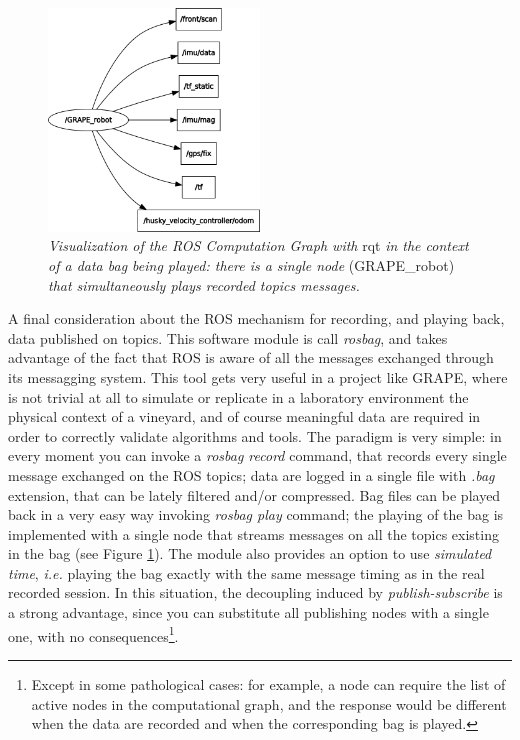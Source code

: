 \begin{figure}
	\centering
	\includegraphics[width=0.5\textwidth]{Images/background_and_tools/bagPlay.png}
	\caption{\textit{Visualization of the \ac{ROS} Computation Graph with} rqt\textit{ in the context of a data bag being played: there is a single node} (GRAPE\_robot) \textit{that simultaneously plays recorded topics messages.}}
	\label{fig:playBag}
\end{figure}

A final consideration about the \ac{ROS} mechanism for recording, and playing back, data published on topics. This software module is call \textit{rosbag}, and takes advantage of the fact that \ac{ROS} is aware of all the messages exchanged through its messagging system. This tool gets very useful in a project like \ac{GRAPE}, where is not trivial at all to simulate or replicate in a laboratory environment the physical context of a vineyard, and of course meaningful data are required in order to correctly validate algorithms and tools.
The paradigm is very simple: in every moment you can invoke a \textit{rosbag record} command, that records every single message exchanged on the \ac{ROS} topics; data are logged in a single file with \textit{.bag} extension, that can be lately filtered and/or compressed. Bag files can be played back in a very easy way invoking \textit{rosbag play} command; the playing of the bag is implemented with a single node that streams messages on all the topics existing in the bag (see Figure \ref{fig:playBag}). The module also provides an option to use \textit{simulated time}, \textit{i.e.} playing the bag exactly with the same message timing as in the real recorded session. In this situation, the decoupling induced by \textit{publish-subscribe} is a strong advantage, since you can substitute all publishing nodes with a single one, with no consequences\footnote{Except in some pathological cases: for example, a node can require the list of  active nodes in the computational graph, and the response would be different when the data are recorded and when the corresponding bag is played.}.


